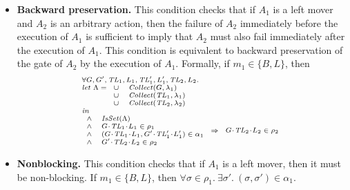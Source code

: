 \begin{itemize}
\item {\bf Backward preservation.}
This condition checks that if $A_1$ is a left mover and $A_2$ 
is an arbitrary action, then the failure of $A_2$ immediately before the execution of $A_1$ 
is sufficient to imply that $A_2$ must also fail immediately after the execution of $A_1$.
This condition is equivalent to backward preservation of the gate of $A_2$ by the execution of $A_1$.
Formally, if $m_1 \in \{B,L\}$, then 
\[
\scriptsize{
\begin{array}{l}
\forall \varsG,\varsG',\varsTL_1,\varsL_1,\varsTL'_1,\varsL'_1,\varsTL_2,\varsL_2. \\
\mathit{let}\ \Lambda =
\begin{array}[t]{ll}
\cup & \Collect(\varsG, \lins_1) \\
\cup & \Collect(\varsTL_1, \lins_1) \\
\cup & \Collect(\varsTL_2, \lins_2) 
\end{array} \\
\mathit{in} \\
\begin{array}{ll}
\wedge & \IsSet(\Lambda) \\
\wedge & \MakeStore{\varsG}{\varsTL_1}{\varsL_1} \in \rho_1 \\
\wedge & (\MakeStore{\varsG}{\varsTL_1}{\varsL_1},\MakeStore{\varsG'}{\varsTL'_1}{\varsL'_1}) \in \alpha_1 \\
\wedge & \MakeStore{\varsG'}{\varsTL_2}{\varsL_2} \in \rho_2 \\
\end{array} 
\Rightarrow 
\begin{array}{l}
\MakeStore{\varsG}{\varsTL_2}{\varsL_2} \in \rho_2 
\end{array}
\end{array}
}
\]

\item {\bf Nonblocking.}
This condition checks that if $A_1$ is a left mover, then it must be non-blocking.
If $m_1 \in \{B, L\}$, then
$\forall \sigma \in \rho_1.\ \exists \sigma'.\ (\sigma, \sigma') \in \alpha_1$.
\end{itemize}


